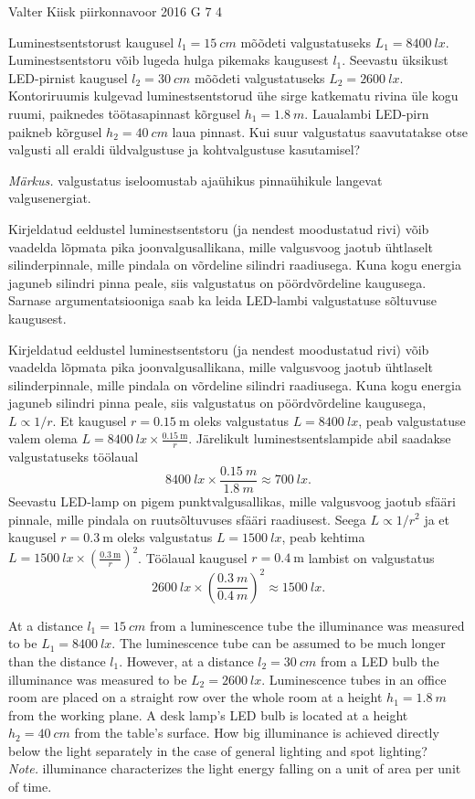 {Valter Kiisk} %
{piirkonnavoor} %
{2016} %
{G 7} %
{4} %
{
\ifStatement
Luminestsentstorust kaugusel $l_1=\SI{15}{cm}$ mõõdeti valgustatuseks $L_1=\SI{8400}{lx}$. Luminestsentstoru võib lugeda hulga pikemaks kaugusest $l_1$. Seevastu üksikust LED-pirnist kaugusel $l_2=\SI{30}{cm}$ mõõdeti valgustatuseks $L_2=\SI{2600}{lx}$. Kontoriruumis kulgevad luminestsentstorud ühe sirge katkematu rivina üle kogu ruumi, paiknedes töötasapinnast kõrgusel $h_1=\SI{1.8}{m}$. Laualambi LED-pirn paikneb kõrgusel $h_2=\SI{40}{cm}$ laua pinnast. Kui suur valgustatus saavutatakse otse valgusti all eraldi üldvalgustuse ja kohtvalgustuse kasutamisel? 

\emph{Märkus.} valgustatus iseloomustab ajaühikus pinnaühikule langevat valgusenergiat.
\fi


\ifHint
Kirjeldatud eeldustel luminestsentstoru (ja nendest moodustatud rivi) võib vaadelda lõpmata pika joonvalgusallikana, mille valgusvoog jaotub ühtlaselt silinderpinnale, mille pindala on võrdeline silindri raadiusega. Kuna kogu energia jaguneb silindri pinna peale, siis valgustatus on pöördvõrdeline kaugusega. Sarnase argumentatsiooniga saab ka leida LED-lambi valgustatuse sõltuvuse kaugusest.
\fi


\ifSolution
Kirjeldatud eeldustel luminestsentstoru (ja nendest moodustatud rivi) võib vaadelda lõpmata pika joonvalgusallikana, mille valgusvoog jaotub ühtlaselt silinderpinnale, mille pindala on võrdeline silindri raadiusega. Kuna kogu energia jaguneb silindri pinna peale, siis valgustatus on pöördvõrdeline kaugusega, $L \propto 1/r$. Et kaugusel $r=\SI{0.15}{\meter}$ oleks valgustatus $L=\SI{8400}{lx}$, peab valgustatuse valem olema $L=\SI{8400}{lx}\times \frac{\SI{0.15}{\meter}} r$. Järelikult luminestsentslampide abil saadakse valgustatuseks töölaual
\[
\SI{8400}{lx}\times\frac{\SI{0.15}{m}}{\SI{1.8}{m}}\approx\SI{700}{lx}.
\]
Seevastu LED-lamp on pigem punktvalgusallikas, mille valgusvoog jaotub sfääri pinnale, mille pindala on ruutsõltuvuses sfääri raadiusest. Seega $L \propto 1/r^2$ ja et kaugusel $r=\SI{0.3}{\meter}$ oleks valgustatus $L=\SI{1500}{lx}$, peab kehtima $L=\SI{1500}{lx}\times \left(\frac{\SI{0.3}{\meter}} {r}\right)^2$. Töölaual kaugusel $r=\SI{0.4}{\meter}$ lambist on valgustatus
\[
\SI{2600}{lx}\times\left(\frac{\SI{0.3}{m}}{\SI{0.4}{m}}\right)^2\approx\SI{1500}{lx}.
\]
\fi


\ifEngStatement
At a distance $l_1=\SI{15}{cm}$ from a luminescence tube the illuminance was measured to be $L_1=\SI{8400}{lx}$. The luminescence tube can be assumed to be much longer than the distance $l_1$. However, at a distance $l_2=\SI{30}{cm}$ from a LED bulb the illuminance was measured to be $L_2=\SI{2600}{lx}$. Luminescence tubes in an office room are placed on a straight row over the whole room at a height $h_1=\SI{1.8}{m}$ from the working plane. A desk lamp’s LED bulb is located at a height $h_2=\SI{40}{cm}$ from the table’s surface. How big illuminance is achieved directly below the light separately in the case of general lighting and spot lighting?\\
\emph{Note.} illuminance characterizes the light energy falling on a unit of area per unit of time.
\fi


}
